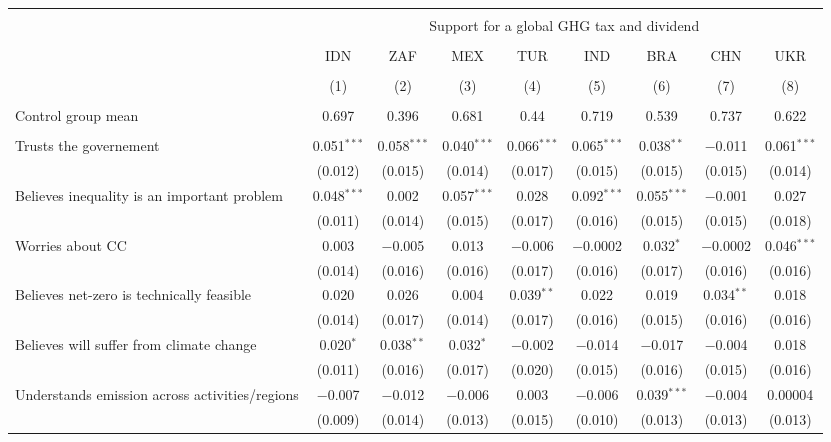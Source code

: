 
\begin{tabular}{@{\extracolsep{5pt}}lcccccccc} 
\\[-1.8ex]\hline 
\hline \\[-1.8ex] 
 & \multicolumn{8}{c}{Support for a global GHG tax and dividend} \\ 
\cline{2-9} 
\\[-1.8ex] & IDN & ZAF & MEX & TUR & IND & BRA & CHN & UKR \\ 
\\[-1.8ex] & (1) & (2) & (3) & (4) & (5) & (6) & (7) & (8)\\ 
\hline \\[-1.8ex] 
Control group mean & 0.697 & 0.396 & 0.681 & 0.44 & 0.719 & 0.539 & 0.737 & 0.622  \\ \hline \\[-1.8ex]
 Trusts the governement & 0.051$^{***}$ & 0.058$^{***}$ & 0.040$^{***}$ & 0.066$^{***}$ & 0.065$^{***}$ & 0.038$^{**}$ & $-$0.011 & 0.061$^{***}$ \\ 
  & (0.012) & (0.015) & (0.014) & (0.017) & (0.015) & (0.015) & (0.015) & (0.014) \\ 
  Believes inequality is an important problem & 0.048$^{***}$ & 0.002 & 0.057$^{***}$ & 0.028 & 0.092$^{***}$ & 0.055$^{***}$ & $-$0.001 & 0.027 \\ 
  & (0.011) & (0.014) & (0.015) & (0.017) & (0.016) & (0.015) & (0.015) & (0.018) \\ 
  Worries about CC & 0.003 & $-$0.005 & 0.013 & $-$0.006 & $-$0.0002 & 0.032$^{*}$ & $-$0.0002 & 0.046$^{***}$ \\ 
  & (0.014) & (0.016) & (0.016) & (0.017) & (0.016) & (0.017) & (0.016) & (0.016) \\ 
  Believes net-zero is technically feasible & 0.020 & 0.026 & 0.004 & 0.039$^{**}$ & 0.022 & 0.019 & 0.034$^{**}$ & 0.018 \\ 
  & (0.014) & (0.017) & (0.014) & (0.017) & (0.016) & (0.015) & (0.016) & (0.016) \\ 
  Believes will suffer from climate change & 0.020$^{*}$ & 0.038$^{**}$ & 0.032$^{*}$ & $-$0.002 & $-$0.014 & $-$0.017 & $-$0.004 & 0.018 \\ 
  & (0.011) & (0.016) & (0.017) & (0.020) & (0.015) & (0.016) & (0.015) & (0.016) \\ 
  Understands emission across activities/regions & $-$0.007 & $-$0.012 & $-$0.006 & 0.003 & $-$0.006 & 0.039$^{***}$ & $-$0.004 & 0.00004 \\ 
  & (0.009) & (0.014) & (0.013) & (0.015) & (0.010) & (0.013) & (0.013) & (0.013) \\ 

\end{tabular}
